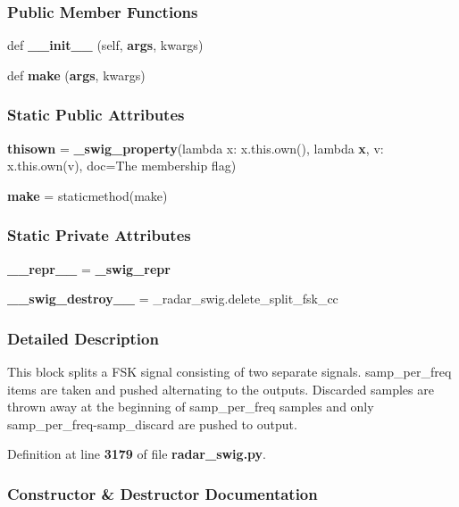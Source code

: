 \subsubsection*{Public Member Functions}
\begin{DoxyCompactItemize}
\item 
def {\bf \+\_\+\+\_\+init\+\_\+\+\_\+} (self, {\bf args}, kwargs)
\item 
def {\bf make} ({\bf args}, kwargs)
\end{DoxyCompactItemize}
\subsubsection*{Static Public Attributes}
\begin{DoxyCompactItemize}
\item 
{\bf thisown} = {\bf \+\_\+swig\+\_\+property}(lambda x\+: x.\+this.\+own(), lambda {\bf x}, v\+: x.\+this.\+own(v), doc=\textquotesingle{}The membership flag\textquotesingle{})
\item 
{\bf make} = staticmethod(make)
\end{DoxyCompactItemize}
\subsubsection*{Static Private Attributes}
\begin{DoxyCompactItemize}
\item 
{\bf \+\_\+\+\_\+repr\+\_\+\+\_\+} = {\bf \+\_\+swig\+\_\+repr}
\item 
{\bf \+\_\+\+\_\+swig\+\_\+destroy\+\_\+\+\_\+} = \+\_\+radar\+\_\+swig.\+delete\+\_\+split\+\_\+fsk\+\_\+cc
\end{DoxyCompactItemize}


\subsubsection{Detailed Description}
\begin{DoxyVerb}This block splits a FSK signal consisting of two separate signals. samp_per_freq items are taken and pushed alternating to the outputs. Discarded samples are thrown away at the beginning of samp_per_freq samples and only samp_per_freq-samp_discard are pushed to output.\end{DoxyVerb}
 

Definition at line {\bf 3179} of file {\bf radar\+\_\+swig.\+py}.



\subsubsection{Constructor \& Destructor Documentation}
